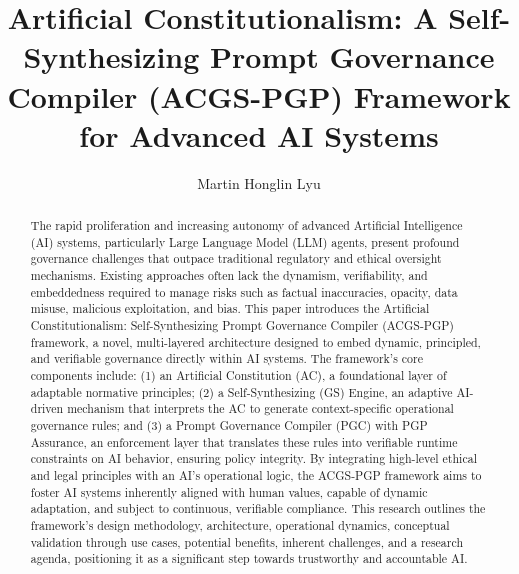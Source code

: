 \documentclass[sigconf,review,anonymous=false]{acmart} %
\begin{document}
\title{Artificial Constitutionalism: A Self-Synthesizing Prompt Governance Compiler (ACGS-PGP) Framework for Advanced AI Systems}

\author{Martin Honglin Lyu}

\renewcommand{\shortauthors}{Martin Honglin Lyu} %

\begin{abstract} %
The rapid proliferation and increasing autonomy of advanced Artificial Intelligence (AI) systems, particularly Large Language Model (LLM) agents, present profound governance challenges that outpace traditional regulatory and ethical oversight mechanisms. Existing approaches often lack the dynamism, verifiability, and embeddedness required to manage risks such as factual inaccuracies, opacity, data misuse, malicious exploitation, and bias. This paper introduces the Artificial Constitutionalism: Self-Synthesizing Prompt Governance Compiler (ACGS-PGP) framework, a novel, multi-layered architecture designed to embed dynamic, principled, and verifiable governance directly within AI systems. The framework's core components include: (1) an Artificial Constitution (AC), a foundational layer of adaptable normative principles; (2) a Self-Synthesizing (GS) Engine, an adaptive AI-driven mechanism that interprets the AC to generate context-specific operational governance rules; and (3) a Prompt Governance Compiler (PGC) with PGP Assurance, an enforcement layer that translates these rules into verifiable runtime constraints on AI behavior, ensuring policy integrity. By integrating high-level ethical and legal principles with an AI's operational logic, the ACGS-PGP framework aims to foster AI systems inherently aligned with human values, capable of dynamic adaptation, and subject to continuous, verifiable compliance. This research outlines the framework's design methodology, architecture, operational dynamics, conceptual validation through use cases, potential benefits, inherent challenges, and a research agenda, positioning it as a significant step towards trustworthy and accountable AI.
\end{abstract}
\end{document}
